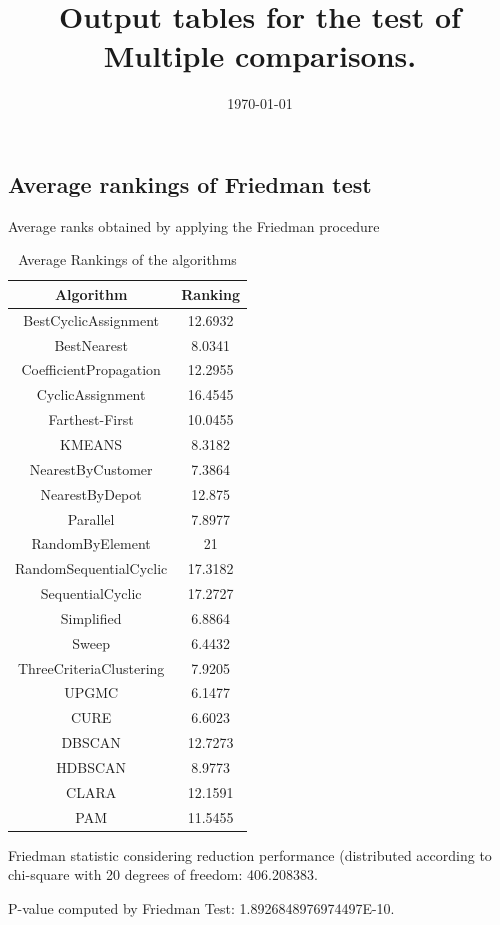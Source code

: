 \documentclass[a4paper,10pt]{article}
\title{Output tables for the test of Multiple comparisons.}
\author{}
\date{\today}
\begin{document}
\begin{landscape}
\pagestyle{empty}
\maketitle
\thispagestyle{empty}
\section{Average rankings of Friedman test}



Average ranks obtained by applying the Friedman procedure

\begin{table}[!htp]
\centering
\begin{tabular}{|c|c|}\hline
Algorithm&Ranking\\\hline
BestCyclicAssignment & 12.6932\\
BestNearest & 8.0341\\
CoefficientPropagation & 12.2955\\
CyclicAssignment & 16.4545\\
Farthest-First & 10.0455\\
KMEANS & 8.3182\\
NearestByCustomer & 7.3864\\
NearestByDepot & 12.875\\
Parallel & 7.8977\\
RandomByElement & 21\\
RandomSequentialCyclic & 17.3182\\
SequentialCyclic & 17.2727\\
Simplified & 6.8864\\
Sweep & 6.4432\\
ThreeCriteriaClustering & 7.9205\\
UPGMC & 6.1477\\
CURE & 6.6023\\
DBSCAN & 12.7273\\
HDBSCAN & 8.9773\\
CLARA & 12.1591\\
PAM & 11.5455\\
\hline
\end{tabular}
\caption{Average Rankings of the algorithms}
\end{table}

Friedman statistic considering reduction performance (distributed according to chi-square with 20 degrees of freedom: 406.208383.

P-value computed by Friedman Test: 1.8926848976974497E-10.\newline


\end{landscape}
\end{document}

